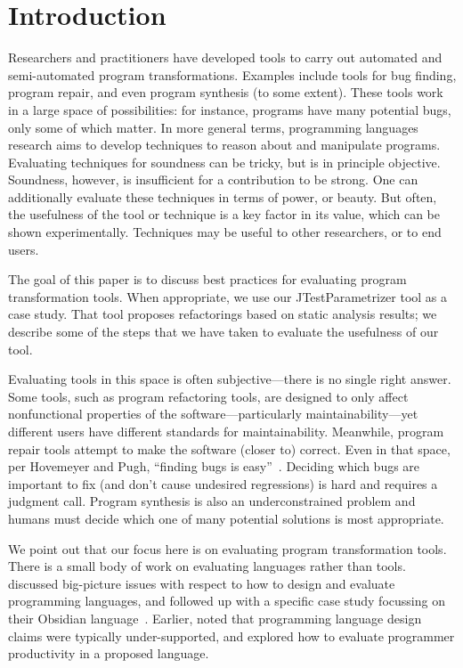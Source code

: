 \section{Introduction}
Researchers and practitioners have developed tools to carry out
automated and semi-automated program transformations.  Examples
include tools for bug finding, program repair, and even 
program synthesis (to some extent). These tools work in a large space of possibilities:
for instance, programs have many potential bugs, only some of which
matter.
In more general terms, programming languages research aims to develop
techniques to reason about and manipulate programs. Evaluating
techniques for soundness can be tricky, but is in principle
objective. Soundness, however, is insufficient for a contribution to
be strong. One can additionally evaluate these techniques in terms of
power, or beauty. But often, the usefulness of the tool or technique
is a key factor in its value, which can be shown
experimentally. Techniques may be useful to other researchers, or to
end users.

The goal of this paper is to discuss best practices for evaluating
program transformation tools. When appropriate, we use our
JTestParametrizer tool as a case study. That tool proposes
refactorings based on static analysis results; we describe some of the
steps that we have taken to evaluate the usefulness of our tool.

Evaluating tools in this space is often subjective---there is no
single right answer. Some tools, such as program refactoring tools,
are designed to only affect nonfunctional properties of the
software---particularly maintainability---yet different users have
different standards for maintainability.  Meanwhile, program repair
tools attempt to make the software (closer to) correct. Even in that
space, per Hovemeyer and Pugh, ``finding bugs is
easy''~\cite{hovemeyer04:_findin_bugs_easy}. Deciding which bugs are
important to fix (and don't cause undesired regressions) is hard and
requires a judgment call. Program synthesis is also an
underconstrained problem and humans must decide which one of many
potential solutions is most appropriate.

We point out that our focus here is on evaluating program transformation tools.
There is a small body of work on evaluating languages rather than tools.
discussed big-picture issues with respect to how to design and evaluate programming languages, and followed up with a specific case study focussing on their Obsidian
language~\cite{coblenz20:_can_advan_type_system_be_usabl}.
Earlier,  noted that programming 
language design claims were typically under-supported, and  explored how to evaluate programmer productivity in a
proposed language. 

